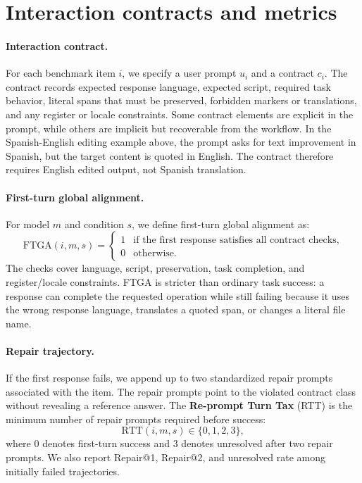 \section{Interaction contracts and metrics}

\paragraph{Interaction contract.}
For each benchmark item $i$, we specify a user prompt $u_i$ and a contract
$c_i$. The contract records expected response language, expected script,
required task behavior, literal spans that must be preserved, forbidden markers
or translations, and any register or locale constraints. Some contract elements
are explicit in the prompt, while others are implicit but recoverable from the
workflow. In the Spanish-English editing example above, the prompt asks for text
improvement in Spanish, but the target content is quoted in English. The
contract therefore requires English edited output, not Spanish translation.

\paragraph{First-turn global alignment.}
For model $m$ and condition $s$, we define first-turn global alignment as:
\[
\mathrm{FTGA}(i,m,s)=
\begin{cases}
1 & \text{if the first response satisfies all contract checks,}\\
0 & \text{otherwise.}
\end{cases}
\]
The checks cover language, script, preservation, task completion, and
register/locale constraints. FTGA is stricter than ordinary task success: a
response can complete the requested operation while still failing because it
uses the wrong response language, translates a quoted span, or changes a literal
file name.

\paragraph{Repair trajectory.}
If the first response fails, we append up to two standardized repair prompts
associated with the item. The repair prompts point to the violated contract
class without revealing a reference answer. The \textbf{Re-prompt Turn Tax}
(RTT) is the minimum number of repair prompts required before success:
\[
\mathrm{RTT}(i,m,s)\in\{0,1,2,3\},
\]
where $0$ denotes first-turn success and $3$ denotes unresolved after two repair
prompts. We also report Repair@1, Repair@2, and unresolved rate among initially
failed trajectories.

